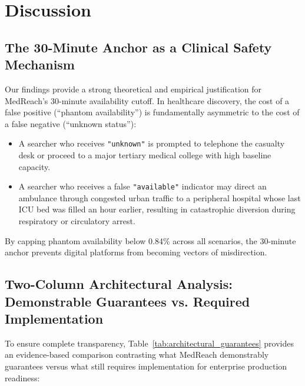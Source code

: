 \documentclass[conference]{IEEEtran}
\begin{document}
\section{Discussion}

\subsection{The 30-Minute Anchor as a Clinical Safety Mechanism}
Our findings provide a strong theoretical and empirical justification for MedReach's 30-minute availability cutoff. In healthcare discovery, the cost of a false positive (``phantom availability'') is fundamentally asymmetric to the cost of a false negative (``unknown status''):
\begin{itemize}
    \item A searcher who receives \texttt{"unknown"} is prompted to telephone the casualty desk or proceed to a major tertiary medical college with high baseline capacity.
    \item A searcher who receives a false \texttt{"available"} indicator may direct an ambulance through congested urban traffic to a peripheral hospital whose last ICU bed was filled an hour earlier, resulting in catastrophic diversion during respiratory or circulatory arrest.
\end{itemize}
By capping phantom availability below 0.84\% across all scenarios, the 30-minute anchor prevents digital platforms from becoming vectors of misdirection.

\subsection{Two-Column Architectural Analysis: Demonstrable Guarantees vs. Required Implementation}
To ensure complete transparency, Table~\ref{tab:architectural_guarantees} provides an evidence-based comparison contrasting what MedReach demonstrably guarantees versus what still requires implementation for enterprise production readiness:
\end{document}
